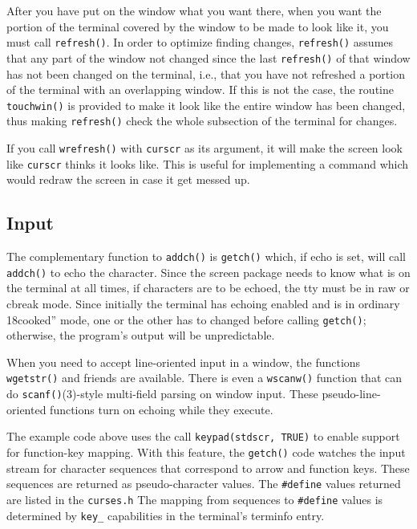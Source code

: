 After you have put on the window what you want there, when you want the portion
of the terminal covered by the window to be made to look like it, you must call
\texttt{refresh()}.  In order to optimize finding changes, \texttt{refresh()}
assumes that any part of the window not changed since the last
\texttt{refresh()} of that window has not been changed on the terminal, i.e.,
that you have not refreshed a portion of the terminal with an overlapping
window.  If this is not the case, the routine \texttt{touchwin()} is provided
to make it look like the entire window has been changed, thus making
\texttt{refresh()} check the whole subsection of the terminal for changes. 

If you call \texttt{wrefresh()} with \texttt{curscr} as its argument, it will
make the screen look like \texttt{curscr} thinks it looks like.  This is useful
for implementing a command which would redraw the screen in case it get messed
up.

\subsection{Input}

\label{f0:input}The complementary function to \texttt{addch()} is \texttt{getch()} which, if
echo is set, will call \texttt{addch()} to echo the character.  Since the
screen package needs to know what is on the terminal at all times, if
characters are to be echoed, the tty must be in raw or cbreak mode.  Since
initially the terminal has echoing enabled and is in ordinary \char18cooked'' mode,
one or the other has to changed before calling \texttt{getch()}; otherwise,
the program's output will be unpredictable. 

When you need to accept line-oriented input in a window, the functions
\texttt{wgetstr()} and friends are available.  There is even a \texttt{wscanw()}
function that can do \texttt{scanf()}(3)-style multi-field parsing on window
input.  These pseudo-line-oriented functions turn on echoing while they
execute. 

The example code above uses the call \texttt{keypad(stdscr, TRUE)} to enable
support for function-key mapping.  With this feature, the \texttt{getch()} code
watches the input stream for character sequences that correspond to arrow and
function keys.  These sequences are returned as pseudo-character values.  The
\texttt{\#define} values returned are listed in the \texttt{curses.h} The
mapping from sequences to \texttt{\#define} values is determined by
\texttt{key\_} capabilities in the terminal's terminfo entry.

